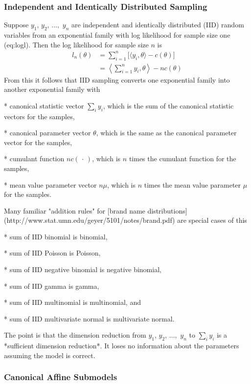 \documentclass[11pt]{article}
\begin{document}
\subsubsection{Independent and Identically Distributed Sampling} \label{sec:iid}

Suppose $y_1$, $y_2$, $\ldots,$ $y_n$ are
independent and identically distributed (IID) random variables
from an exponential family with log
likelihood for sample size one \@ref(eq:logl).
Then the log likelihood for sample size $n$ is
\begin{align*}
   l_n(\theta)
   & =
   \sum_{i = 1}^n \bigl[ \langle y_i, \theta \rangle - c(\theta) \bigr]
   \\
   & = \left\langle \sum_{i = 1}^n y_i, \theta \right\rangle - n c(\theta)
\end{align*}
From this it follows that IID sampling converts one exponential family
into another exponential family with

 * canonical statistic vector $\sum_i y_i$, which is the sum of the
   canonical statistic vectors for the samples,

 * canonical parameter vector $\theta$, which is the same as the
   canonical parameter vector for the samples,

 * cumulant function $n c(\,\cdot\,)$, which is $n$ times the
   cumulant function for the samples,

 * mean value parameter vector $n \mu$, which is $n$ times the
   mean value parameter $\mu$ for the samples.

Many familiar "addition rules" for
[brand name distributions](http://www.stat.umn.edu/geyer/5101/notes/brand.pdf)
are special cases of this

 * sum of IID binomial is binomial,

 * sum of IID Poisson is Poisson,

 * sum of IID negative binomial is negative binomial,

 * sum of IID gamma is gamma,

 * sum of IID multinomial is multinomial, and

 * sum of IID multivariate normal is multivariate normal.

The point is that the dimension reduction from $y_1$, $y_2$, $\ldots,$ $y_n$
to $\sum_i y_i$ is a *sufficient dimension reduction*.
It loses no information about the parameters assuming the model is correct.

\subsubsection{Canonical Affine Submodels} \label{sec:casm}
\end{document}
